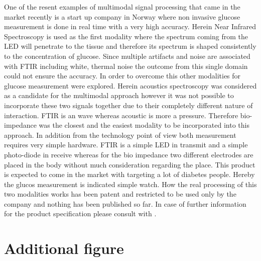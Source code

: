 \documentclass[a4paper]{article}
\begin{document}
One of the resent examples of multimodal signal processing that came in the market recently is a start up company in Norway where non invasive glucose measurement is done in real time with a very high accuracy. Herein Near Infrared Spectroscopy is used as the first modality where the spectrum coming from the LED will penetrate to the tissue and therefore its spectrum is shaped consistently to the concentration of glucose. Since multiple artifacts and noise are associated with FTIR including white, thermal noise the outcome from this single domain could not ensure the accuracy. In order to overcome this other modalities for glucose measurement were explored. Herein acoustics spectroscopy was considered as a candidate for the multimodal approach however it was not possible to incorporate these two signals together due to their completely different nature of interaction. FTIR is an wave whereas acoustic is more a pressure. Therefore bio-impedance was the closest and the easiest modality to be incorporated into this approach. In addition from the technology point of view both measurement requires very simple hardware. FTIR is a simple LED in transmit and a simple photo-diode in receive whereas for the bio impedance two different electrodes are placed in the body without much consideration regarding the place. This product is expected to come in the market with targeting a lot of diabetes people. Hereby the glucos measurement is indicated simple watch. How the real processing of this two modalities works has been patent and restricted to be used only by the company and nothing has been published so far. In case of further information for the product specification please consult with \cite{20}. 

\clearpage
\appendix


\newpage



\section{Additional figure}
\end{document}
